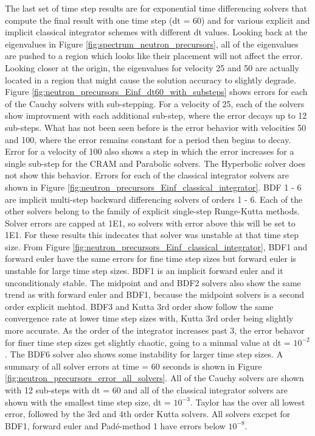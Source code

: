 The last set of time step results are for exponential time differencing solvers that compute the final result with one time step (dt = 60) and for various explicit and implicit classical integrator schemes with different dt values. Looking back at the eigenvalues in Figure \ref{fig:spectrum_neutron_precursors}, all of the eigenvalues are pushed to a region which looks like their placement will not affect the error. Looking closer at the origin, the eigenvalues for velocity 25 and 50 are actually located in a region that might cause the solution accuracy to slightly degrade. Figure \ref{fig:neutron_precursors_Einf_dt60_with_substeps} shows errors for each of the Cauchy solvers with sub-stepping. For a velocity of 25, each of the solvers show improvment with each additional sub-step, where the error decays up to 12 sub-steps. What has not been seen before is the error behavior with velocities 50 and 100, where the error remains constant for a period then begins to decay. Error for a velocity of 100 also shows a step in which the error increases for a single sub-step for the CRAM and Parabolic solvers. The Hyperbolic solver does not show this behavior. Errors for each of the classical integrator solvers are shown in Figure \ref{fig:neutron_precursors_Einf_classical_integrator}. BDF 1 - 6 are implicit multi-step backward differencing solvers of orders 1 - 6. Each of the other solvers belong to the family of explicit single-step Runge-Kutta methods. Solver errors are capped at 1E1, so solvers with error above this will be set to 1E1. For these results this indecates that solver was unstable at that time step size. From Figure \ref{fig:neutron_precursors_Einf_classical_integrator}, BDF1 and forward euler have the same errors for fine time step sizes but forward euler is unstable for large time step sizes. BDF1 is an implicit forward euler and it unconditionaly stable. The midpoint and and BDF2 solvers also show the same trend as with forward euler and BDF1, because the midpoint solvers is a second order explicit mehtod. BDF3 and Kutta 3rd order show follow the same convergence rate at lower time step sizes with, Kutta 3rd order being slightly more accurate. As the order of the integrator increases past 3, the error behavor for finer time step sizes get slightly chaotic, going to a minmal value at dt = $10^{-2}$. The BDF6 solver also shows some instability for larger time step sizes. A summary of all solver errors at time = 60 seconds is shown in Figure \ref{fig:neutron_precursors_error_all_solvers}. All of the Cauchy solvers are shown with 12 sub-steps with dt = 60 and all of the classical integrator solvers are shown with the smallest time step size, dt = $10^{-3}$. Taylor has the over all lowest error, followed by the 3rd and 4th order Kutta solvers. All solvers excpet for BDF1, forward euler and Pad\'e-method 1 have errors below $10^{-8}$.

